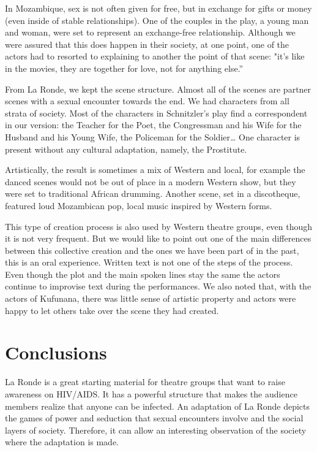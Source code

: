 \documentclass[article,twocolumn]{memoir}
\begin{document}
In Mozambique, sex is not often given for free, but in exchange for gifts or
money (even inside of stable relationships). One of the couples in the play, a
young man and woman, were set to represent an exchange-free relationship.
Although we were assured that this does happen in their society, at one point,
one of the actors had to resorted to explaining to another the point of that
scene: "it's like in the movies, they are together for love, not for anything
else.''

From La Ronde, we kept the scene structure. Almost all of the scenes are
partner scenes with a sexual encounter towards the end. We had characters from
all strata of society. Most of the characters in Schnitzler's play find a
correspondent in our version: the Teacher for the Poet, the Congressman and his
Wife for the Husband and his Young Wife, the Policeman for the Soldier\ldots
One character is present without any cultural adaptation, namely, the
Prostitute.

Artistically, the result is sometimes a mix of Western and local, for example
the danced scenes would not be out of place in a modern Western show, but they
were set to traditional African drumming. Another scene, set in a discotheque,
featured loud Mozambican pop, local music inspired by Western forms.

This type of creation process is also used by Western theatre groups, even
though it is not very frequent. But we would like to point out one of the main
differences between this collective creation and the ones we have been part of
in the past, this is an oral experience. Written text is not one of the steps of
the process. Even though the plot and the main spoken lines stay the same the
actors continue to improvise text during the performances. We also noted that,
with the actors of Kufunana, there was little sense of artistic property and
actors were happy to let others take over the scene they had created.

\chapter{Conclusions}

La Ronde is a great starting material for theatre groups that want to raise
awareness on HIV/AIDS. It has a powerful structure that makes the audience
members realize that anyone can be infected. An adaptation of La Ronde depicts
the games of power and seduction that sexual encounters involve and the social
layers of society. Therefore, it can allow an interesting observation of the
society where the adaptation is made.
\end{document}
